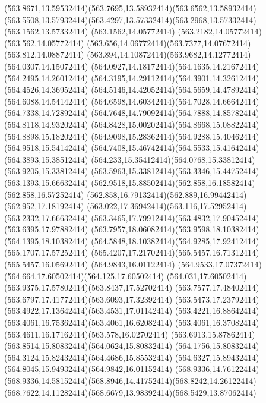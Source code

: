 {{	\curveto(563.8671,13.59532414)(563.7695,13.58932414)(563.6562,13.58932414)
	\curveto(563.5508,13.57932414)(563.4297,13.57332414)(563.2968,13.57332414)
	\lineto(563.1562,13.57332414)
	\lineto(563.1562,14.05772414)
	\lineto(563.2182,14.05772414)
	\lineto(563.562,14.05772414)
	\curveto(563.656,14.06772414)(563.7377,14.07672414)(563.812,14.08872414)
	\curveto(563.894,14.10872414)(563.9682,14.12772414)(564.0307,14.15072414)
	\curveto(564.0927,14.18172414)(564.1635,14.21672414)(564.2495,14.26012414)
	\curveto(564.3195,14.29112414)(564.3901,14.32612414)(564.4526,14.36952414)
	\curveto(564.5146,14.42052414)(564.5659,14.47892414)(564.6088,14.54142414)
	\curveto(564.6598,14.60342414)(564.7028,14.66642414)(564.7338,14.72892414)
	\curveto(564.7648,14.79092414)(564.7888,14.85782414)(564.8118,14.93202414)
	\curveto(564.8428,15.00202414)(564.8668,15.08822414)(564.8898,15.18202414)
	\curveto(564.9098,15.28362414)(564.9288,15.40462414)(564.9518,15.54142414)
	\curveto(564.7408,15.46742414)(564.5533,15.41642414)(564.3893,15.38512414)
	\curveto(564.233,15.35412414)(564.0768,15.33812414)(563.9205,15.33812414)
	\curveto(563.5963,15.33812414)(563.3346,15.44752414)(563.1393,15.66632414)
	\curveto(562.9518,15.88502414)(562.858,16.18582414)(562.858,16.57252414)
	\curveto(562.858,16.79132414)(562.889,16.99442414)(562.952,17.18192414)
	\curveto(563.022,17.36942414)(563.116,17.52952414)(563.2332,17.66632414)
	\curveto(563.3465,17.79912414)(563.4832,17.90452414)(563.6395,17.97882414)
	\curveto(563.7957,18.06082414)(563.9598,18.10382414)(564.1395,18.10382414)
	\curveto(564.5848,18.10382414)(564.9285,17.92412414)(565.1707,17.57252414)
	\curveto(565.4207,17.21702414)(565.5457,16.71312414)(565.5457,16.05692414)
	\closepath
	\moveto(564.9843,16.01122414)
	\curveto(564.9533,17.07372414)(564.664,17.60502414)(564.125,17.60502414)
	\curveto(564.031,17.60502414)(563.9375,17.57802414)(563.8437,17.52702414)
	\curveto(563.7577,17.48402414)(563.6797,17.41772414)(563.6093,17.32392414)
	\curveto(563.5473,17.23792414)(563.4922,17.13642414)(563.4531,17.01142414)
	\curveto(563.4221,16.88642414)(563.4061,16.75362414)(563.4061,16.62082414)
	\curveto(563.4061,16.37082414)(563.4611,16.17162414)(563.578,16.02702414)
	\curveto(563.6913,15.87862414)(563.8514,15.80832414)(564.0624,15.80832414)
	\curveto(564.1756,15.80832414)(564.3124,15.82432414)(564.4686,15.85532414)
	\curveto(564.6327,15.89432414)(564.8045,15.94932414)(564.9842,16.01152414)
	\closepath
	\moveto(568.9336,14.76122414)
	\curveto(568.9336,14.58152414)(568.8946,14.41752414)(568.8242,14.26122414)
	\curveto(568.7622,14.11282414)(568.6679,13.98392414)(568.5429,13.87062414)
}}
